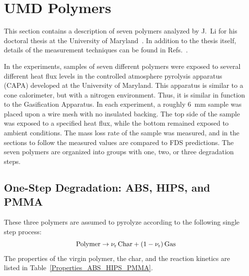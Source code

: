 \clearpage

\section{UMD Polymers}

This section contains a description of seven polymers analyzed by J.~Li for his doctoral thesis at the University of Maryland~\cite{Li:Thesis}. In addition to the thesis itself, details of the measurement techniques can be found in Refs.~\cite{Li:IJHMT,Li:CF,Linteris:2,Li:PDS_2014,Li:PDS_2015}.

In the experiments, samples of seven different polymers were exposed to several different heat flux levels in the controlled atmosphere pyrolysis apparatus (CAPA) developed at the University of Maryland. This apparatus is similar to a cone calorimeter, but with a nitrogen environment. Thus, it is similar in function to the Gasification Apparatus. In each experiment, a roughly 6~mm sample was placed upon a wire mesh with no insulated backing. The top side of the sample was exposed to a specified heat flux, while the bottom remained exposed to ambient conditions. The mass loss rate of the sample was measured, and in the sections to follow the measured values are compared to FDS predictions. The seven polymers are organized into groups with one, two, or three degradation steps.

\subsection{One-Step Degradation: ABS, HIPS, and PMMA}

These three polymers are assumed to pyrolyze according to the following single step process:
\begin{equation}
   \hbox{Polymer}  \to \nu_{\rm r} \, \hbox{Char} + (1-\nu_{\rm r}) \, \hbox{Gas}
\end{equation}
The properties of the virgin polymer, the char, and the reaction kinetics are listed in Table~\ref{Properties_ABS_HIPS_PMMA}.


